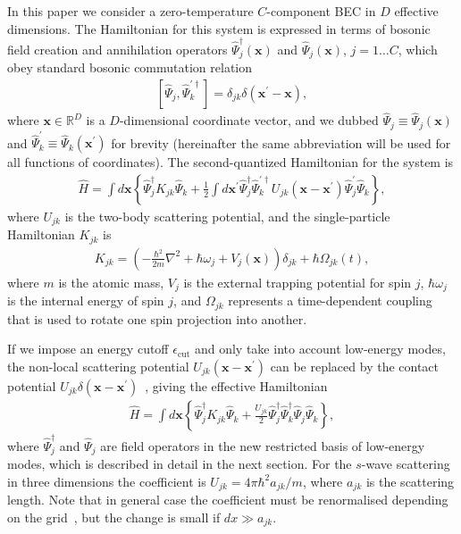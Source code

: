 \documentclass[12pt,aip,jmp,amssymb,amsmath]{revtex4-1}
\begin{document}
In this paper we consider a zero-temperature $C$-component BEC in $D$ effective dimensions.
The Hamiltonian for this system is expressed in terms of bosonic field creation and annihilation operators $\hat{\Psi}_j^{\dagger}(\boldsymbol{x})$ and $\hat{\Psi}_j(\boldsymbol{x})$, $j = 1 \ldots C$, which obey standard bosonic commutation relation
\begin{eqnarray}\label{eqn:master-eqn:commutators}
    [ \hat{\Psi}_j, \hat{\Psi}_k^{\prime\dagger} ]
    = \delta_{jk} \delta(\boldsymbol{x}^\prime-\boldsymbol{x}),
\end{eqnarray}
where $\boldsymbol{x} \in \mathbb{R}^D$ is a $D$-dimensional coordinate vector, and we dubbed $\hat{\Psi}_j \equiv \hat{\Psi}_j(\boldsymbol{x})$ and $\hat{\Psi}_k^\prime \equiv \hat{\Psi}_k(\boldsymbol{x}^\prime)$ for brevity (hereinafter the same abbreviation will be used for all functions of coordinates).
The second-quantized Hamiltonian for the system is
\begin{eqnarray}\label{eqn:master-eqn:hamiltonian}
    \hat{H}
    = \int d\boldsymbol{x} \left\{
        \hat{\Psi}_j^{\dagger} K_{jk} \hat{\Psi}_k
        + \frac{1}{2} \int d\boldsymbol{x}^\prime
            \hat{\Psi}_j^\dagger \hat{\Psi}_k^{\prime\dagger}
            U_{jk}(\boldsymbol{x} - \boldsymbol{x}^\prime)
            \hat{\Psi}_j^\prime \hat{\Psi}_k
    \right\},
\end{eqnarray}
where $U_{jk}$ is the two-body scattering potential, and the single-particle Hamiltonian $K_{jk}$ is
\begin{eqnarray}\label{eqn:master-eqn:single-particle}
    K_{jk} = \left(
            -\frac{\hbar^2}{2m} \nabla^2 + \hbar \omega_j + V_j(\boldsymbol{x})
        \right) \delta_{jk}
        + \hbar \Omega_{jk}(t),
\end{eqnarray}
where $m$ is the atomic mass, $V_j$ is the external trapping potential for spin $j$, $\hbar \omega_j$ is the internal energy of spin $j$, and $\Omega_{jk}$ represents a time-dependent coupling that is used to rotate one spin projection into another.

If we impose an energy cutoff $\epsilon_{\mathrm{cut}}$ and only take into account low-energy modes, the non-local scattering potential $U_{jk}(\boldsymbol{x} - \boldsymbol{x}^\prime)$ can be replaced by the contact potential $U_{jk} \delta(\boldsymbol{x} - \boldsymbol{x}^\prime)$~\cite{Morgan2000}, giving the effective Hamiltonian
\begin{eqnarray}\label{eqn:master-eqn:effective-H}
    \hat{H}
    = \int d\boldsymbol{x} \left\{
        \hat{\Psi}_j^{\dagger} K_{jk} \hat{\Psi}_k
        + \frac{U_{jk}}{2} \hat{\Psi}_j^\dagger \hat{\Psi}_k^\dagger \hat{\Psi}_j \hat{\Psi}_k
    \right\},
\end{eqnarray}
where $\hat{\Psi}_j^{\dagger}$ and $\hat{\Psi}_j$ are field operators in the new restricted basis of low-energy modes, which is described in detail in the next section.
For the $s$-wave scattering in three dimensions the coefficient is $U_{jk} = 4 \pi \hbar^2 a_{jk} / m$, where $a_{jk}$ is the scattering length.
Note that in general case the coefficient must be renormalised depending on the grid~\cite{Sinatra2002}, but the change is small if $dx \gg a_{jk}$.
\end{document}

